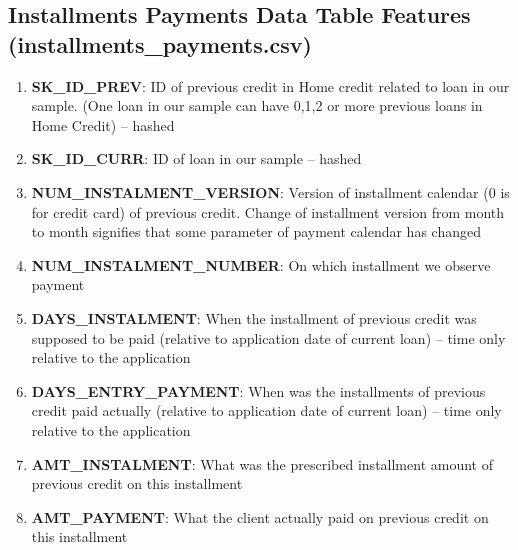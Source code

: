 \documentclass[12pt, letterpaper]{article}
\begin{document}
\begin{appendices}
\subsection{Installments Payments Data Table Features (installments_payments.csv)}
\begin{enumerate}
  \item \textbf{SK_ID_PREV}: ID of previous credit in Home credit related to loan in our sample. (One loan in our sample can have 0,1,2 or more previous loans in Home Credit) -- hashed
  \item \textbf{SK_ID_CURR}: ID of loan in our sample -- hashed
  \item \textbf{NUM_INSTALMENT_VERSION}: Version of installment calendar (0 is for credit card) of previous credit. Change of installment version from month to month signifies that some parameter of payment calendar has changed
  \item \textbf{NUM_INSTALMENT_NUMBER}: On which installment we observe payment
  \item \textbf{DAYS_INSTALMENT}: When the installment of previous credit was supposed to be paid (relative to application date of current loan) -- time only relative to the application
  \item \textbf{DAYS_ENTRY_PAYMENT}: When was the installments of previous credit paid actually (relative to application date of current loan) -- time only relative to the application
  \item \textbf{AMT_INSTALMENT}: What was the prescribed installment amount of previous credit on this installment
  \item \textbf{AMT_PAYMENT}: What the client actually paid on previous credit on this installment
\end{enumerate}


\end{appendices}
\end{document}
